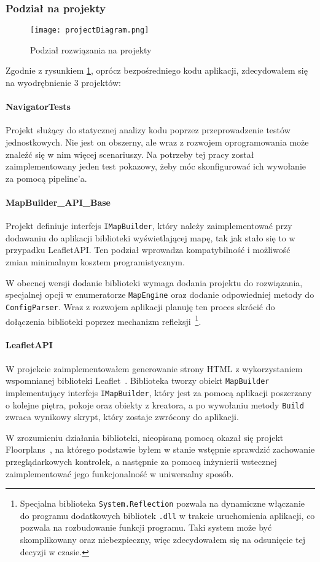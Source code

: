 \subsubsection{Podział na projekty}
\begin{figure}[!h]
    \centering
    \texttt{[image: projectDiagram.png]}
    \caption{Podział rozwiązania na projekty}
    \label{img:projectDiagram}
\end{figure}

Zgodnie z rysunkiem \ref{img:projectDiagram}, oprócz bezpośredniego kodu aplikacji, 
zdecydowałem się na wyodrębnienie 3 projektów:

\paragraph{NavigatorTests}
Projekt służący do statycznej analizy kodu poprzez przeprowadzenie testów jednostkowych.
Nie jest on obszerny, ale wraz z rozwojem oprogramowania może znaleźć się w nim więcej 
scenariuszy. Na potrzeby tej pracy został zaimplementowany jeden test pokazowy, 
żeby móc skonfigurować ich wywołanie za pomocą pipeline'a.

\paragraph{MapBuilder\_API\_Base}
Projekt definiuje interfejs \verb|IMapBuilder|, który należy zaimplementować przy dodawaniu 
do aplikacji biblioteki wyświetlającej mapę, tak jak stało się to w przypadku LeafletAPI.
Ten podział wprowadza kompatybilność i możliwość zmian minimalnym kosztem programistycznym.

W obecnej wersji dodanie biblioteki wymaga dodania projektu do rozwiązania, specjalnej opcji w enumeratorze 
\verb|MapEngine| oraz dodanie odpowiedniej metody do \verb|ConfigParser|. Wraz z rozwojem aplikacji 
planuję ten proces skrócić do dołączenia biblioteki poprzez mechanizm refleksji~\cprotect\footnote{%
    Specjalna biblioteka \verb|System.Reflection| pozwala na dynamiczne włączanie do programu 
    dodatkowych bibliotek \verb|.dll| w trakcie uruchomienia aplikacji, co pozwala na rozbudowanie 
    funkcji programu. Taki system może być skomplikowany oraz niebezpieczny, więc zdecydowałem się 
    na odsunięcie tej decyzji w czasie.
}.

\paragraph{LeafletAPI}
W projekcie zaimplementowałem generowanie strony HTML z wykorzystaniem wspomnianej biblioteki Leaflet~\cite{leafletGithub}.
Biblioteka tworzy obiekt \verb|MapBuilder| implementujący interfejs \verb|IMapBuilder|, który jest 
za pomocą aplikacji poszerzany o kolejne piętra, pokoje oraz obiekty z kreatora, a po wywołaniu 
metody \verb|Build| zwraca wynikowy skrypt, który zostaje zwrócony do aplikacji.

W zrozumieniu działania biblioteki, nieopisaną pomocą okazał się projekt Floorplans~\cite{floorplansGithub},
na którego podstawie byłem w stanie wstępnie sprawdzić zachowanie przeglądarkowych kontrolek, 
a następnie za pomocą inżynierii wstecznej zaimplementować jego funkcjonalność w uniwersalny sposób.


